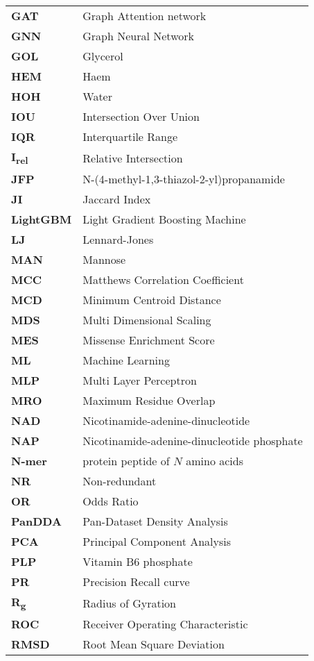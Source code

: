 \begin{longtable}[l]{@{}p{2.5cm}p{12cm}@{}}
\textbf{GAT} & Graph Attention network \\
\textbf{GNN} & Graph Neural Network \\
\textbf{GOL} & Glycerol \\
\textbf{HEM} & Haem \\
\textbf{HOH} & Water \\
\textbf{IOU} & Intersection Over Union \\
\textbf{IQR} & Interquartile Range \\
\textbf{I\textsubscript{rel}} & Relative Intersection \\
\textbf{JFP} & N-(4-methyl-1,3-thiazol-2-yl)propanamide \\
\textbf{JI} & Jaccard Index \\
\textbf{LightGBM} & Light Gradient Boosting Machine \\
\textbf{LJ} & Lennard-Jones \\
\textbf{MAN} & Mannose \\
\textbf{MCC} & Matthews Correlation Coefficient \\
\textbf{MCD} & Minimum Centroid Distance \\
\textbf{MDS} & Multi Dimensional Scaling \\
\textbf{MES} & Missense Enrichment Score \\
\textbf{ML} & Machine Learning \\
\textbf{MLP} & Multi Layer Perceptron \\
\textbf{MRO} & Maximum Residue Overlap \\
\textbf{NAD} & Nicotinamide-adenine-dinucleotide \\
\textbf{NAP} & Nicotinamide-adenine-dinucleotide phosphate \\
\textbf{N-mer} & protein peptide of $N$ amino acids \\
\textbf{NR} & Non-redundant \\
\textbf{OR} & Odds Ratio \\
\textbf{PanDDA} & Pan-Dataset Density Analysis \\
\textbf{PCA} & Principal Component Analysis \\
\textbf{PLP} & Vitamin B6 phosphate \\
\textbf{PR} & Precision Recall curve \\
\textbf{R\textsubscript{g}} & Radius of Gyration \\
\textbf{ROC} & Receiver Operating Characteristic \\
\textbf{RMSD} & Root Mean Square Deviation \\

\end{longtable}

